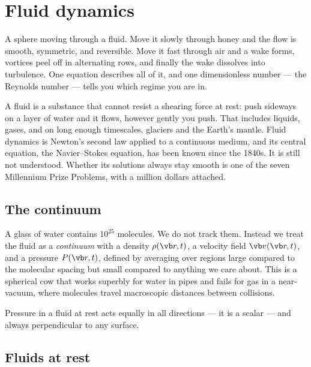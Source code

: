 \chapter{Fluid dynamics}
\label{ch:fluids}



\begin{prototype}
A sphere moving through a fluid. Move it slowly through honey and the flow is smooth, symmetric, and reversible. Move it fast through air and a wake forms, vortices peel off in alternating rows, and finally the wake dissolves into turbulence. One equation describes all of it, and one dimensionless number --- the Reynolds number --- tells you which regime you are in.
\end{prototype}

A fluid is a substance that cannot resist a shearing force at rest: push sideways on a layer of water and it flows, however gently you push. That includes liquids, gases, and on long enough timescales, glaciers and the Earth's mantle. Fluid dynamics is Newton's second law applied to a continuous medium, and its central equation, the Navier--Stokes equation, has been known since the 1840s. It is still not understood. Whether its solutions always stay smooth is one of the seven Millennium Prize Problems, with a million dollars attached.

\section{The continuum}

A glass of water contains $10^{25}$ molecules. We do not track them. Instead we treat the fluid as a \emph{continuum} with a density $\rho(\vb r,t)$, a velocity field $\vb v(\vb r,t)$, and a pressure $P(\vb r,t)$, defined by averaging over regions large compared to the molecular spacing but small compared to anything we care about. This is a spherical cow that works superbly for water in pipes and fails for gas in a near-vacuum, where molecules travel macroscopic distances between collisions.

Pressure in a fluid at rest acts equally in all directions --- it is a scalar --- and always perpendicular to any surface.

\section{Fluids at rest}

